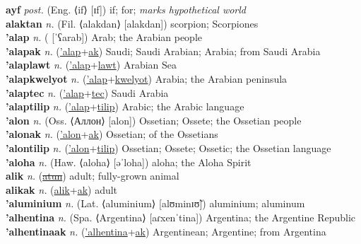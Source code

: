 \textbf{ayf} \textit{post.} (Eng. ⟨if⟩ [ɪf])
if; for; \textit{marks hypothetical world} \label{ayf} \\
\textbf{alaktan} \textit{n.} (Fil. ⟨alakdan⟩ [alakdan])
scorpion; Scorpiones \label{alaktan} \\
\textbf{'alap} \textit{n.} ( [ˈʕarab])
Arab; the Arabian people \label{'alap} \\
\textbf{'alapak} \textit{n.} (\hyperref['alap]{'alap}+\hyperref[ak]{ak})
Saudi; Saudi Arabian; Arabia; from Saudi Arabia \label{'alapak} \\
\textbf{'alaplawt} \textit{n.} (\hyperref['alap]{'alap}+\hyperref[lawt]{lawt})
Arabian Sea \label{'alaplawt} \\
\textbf{'alapkwelyot} \textit{n.} (\hyperref['alap]{'alap}+\hyperref[kwelyot]{kwelyot})
Arabia; the Arabian peninsula \label{'alapkwelyot} \\
\textbf{'alaptec} \textit{n.} (\hyperref['alap]{'alap}+\hyperref[tec]{tec})
Saudi Arabia \label{'alaptec} \\
\textbf{'alaptilip} \textit{n.} (\hyperref['alap]{'alap}+\hyperref[tilip]{tilip})
Arabic; the Arabic language \label{'alaptilip} \\
\textbf{'alon} \textit{n.} (Oss. ⟨Аллон⟩ [alon])
Ossetian; Ossete; the Ossetian people \label{'alon} \\
\textbf{'alonak} \textit{n.} (\hyperref['alon]{'alon}+\hyperref[ak]{ak})
Ossetian; of the Ossetians \label{'alonak} \\
\textbf{'alontilip} \textit{n.} (\hyperref['alon]{'alon}+\hyperref[tilip]{tilip})
Ossetian; Ossete; Ossetic; the Ossetian language \label{'alontilip} \\
\textbf{'aloha} \textit{n.} (Haw. ⟨aloha⟩ [əˈloha])
aloha; the Aloha Spirit \label{'aloha} \\
\textbf{alik} \textit{n.} (\hyperref[atun]{\sout{atun}})
adult; fully-grown animal \label{alik} \\
\textbf{alikak} \textit{n.} (\hyperref[alik]{alik}+\hyperref[ak]{ak})
adult \label{alikak} \\
\textbf{'aluminium} \textit{n.} (Lat. ⟨aluminium⟩ [alʊminɪʊ̃])
aluminium; aluminum \label{'aluminium} \\
\textbf{'alhentina} \textit{n.} (Spa. ⟨Argentina⟩ [aɾxenˈtina])
Argentina; the Argentine Republic \label{'alhentina} \\
\textbf{'alhentinaak} \textit{n.} (\hyperref['alhentina]{'alhentina}+\hyperref[ak]{ak})
Argentinean; Argentine; from Argentina \label{'alhentinaak} \\
